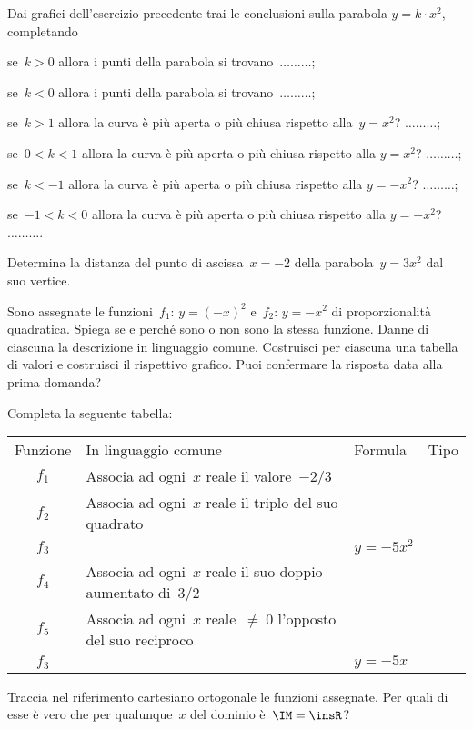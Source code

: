 \begin{esercizio}
\label{ese:D.54}
Dai grafici dell'esercizio precedente trai le conclusioni sulla parabola $y=k\cdot x^2$, completando

\begin{enumeratea}
\item se~$k>0$ allora i punti della parabola si trovano~$\ldots \ldots \ldots$;
\item se~$k<0$ allora i punti della parabola si trovano~$\ldots \ldots \ldots$;
\item se~$k>1$ allora la curva è più aperta o più chiusa rispetto alla~$y=x^{2}$? $\ldots \ldots \ldots$;
\item se~$0<k<1$ allora la curva è più aperta o più chiusa rispetto alla  $y=x^{2}$? $\ldots \ldots \ldots$;
\item se~$k<-1$ allora la curva è più aperta o più chiusa rispetto alla  $y=-x^{2}$? $\ldots \ldots \ldots$;
\item se~$-1<k<0$ allora la curva è più aperta o più chiusa rispetto alla  $y=-x^{2}$? $\ldots \ldots \ldots$.
\end{enumeratea}
\end{esercizio}

\begin{esercizio}
\label{ese:D.55}
Determina la distanza del punto di ascissa~$x=-2$ della parabola~$y=3x^{2}$ dal suo vertice.
\end{esercizio}

\begin{esercizio}
\label{ese:D.56}
Sono assegnate le funzioni~$f_{1}:\, y=(-x)^{2}$ e~$f_{2}:\, y=-x^{2}$ di proporzionalità quadratica.
Spiega se e perché sono o non sono la stessa funzione.
Danne di ciascuna la descrizione in linguaggio comune.
Costruisci per ciascuna una tabella di valori e costruisci il rispettivo grafico.
Puoi confermare la risposta data alla prima domanda?
\end{esercizio}

\begin{esercizio}
\label{ese:D.57}
Completa la seguente tabella:
\begin{center}
 \begin{tabular}{clll}
  \toprule
  Funzione&In linguaggio comune&Formula&Tipo\\
  $f_1$&Associa ad ogni~$x$ reale il valore~$-2/3$& &\\
  $f_2$&Associa ad ogni~$x$ reale il triplo del suo quadrato& & \\
  $f_3$& &$y=-5x^2$& \\
  $f_4$&Associa ad ogni~$x$ reale il suo doppio aumentato di~$3/2$& & \\
  $f_5$&Associa ad ogni~$x$ reale~$\neq~0$ l'opposto del suo reciproco& & \\
  $f_3$& &$y=-5x$& \\
  \bottomrule
 \end{tabular}
\end{center}
Traccia nel riferimento cartesiano ortogonale le funzioni assegnate. Per quali di esse è vero che per qualunque~$x$ del dominio è~$\IM=\insR$?
\end{esercizio}

